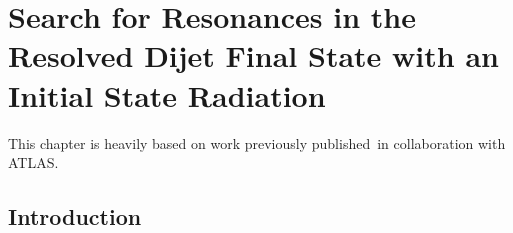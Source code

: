 \chapter{Search for Resonances in the Resolved Dijet Final State with an Initial State Radiation}
\label{chapter:dijetISR}

This chapter is heavily based on work previously published~\cite{dijetISR2019}in collaboration with ATLAS.

\section{Introduction}

\newcommand{\pt}{\ensuremath{p_{\text{T}}}\xspace}
\newcommand{\MGMCatNLOV}[1]{\textsc{MadGraph5}\_aMC@NLO~#1\xspace}
\newcommand{\PYTHIA}{\textsc{Pythia}\xspace}

\newcommand{\ifb}{\ensuremath(ifb)}
\newcommand{\ptmin}{\ensuremath{\pt^{\textrm{min}}}\xspace}
\newcommand{\nphoton}{\ensuremath{n_{\gamma}}\xspace}
\newcommand{\photonPt}{\ensuremath{E_{\textrm{T}}^{\gamma}}\xspace}
\newcommand{\jetPt}{\ensuremath{p_{\textrm{T}}^{\textrm{jet}}}\xspace}
\newcommand{\ntag}{\ensuremath{n_{\textrm{$b$-tag}}}\xspace}
\newcommand{\mjj}{\ensuremath{m_{\textrm{jj}}}\xspace}
\newcommand{\yStar}{\ensuremath{y^{\ast}}\xspace}
\newcommand{\jetEta}{\ensuremath{\eta^{\textrm{jet}}}\xspace}

\newcommand{\photonPtTrig}{\ensuremath{E_{\textrm{T, trig}}^{\gamma}}\xspace}
\newcommand{\photonEta}{\ensuremath{\eta^{\gamma}}\xspace}
\newcommand{\photonY}{\ensuremath{y^{\gamma}}\xspace}
\newcommand{\photonPhi}{\ensuremath{\phi^{\gamma}}\xspace}
\newcommand{\jetEt}{\ensuremath{E_{\textrm{T}}^{\textrm{jet}}}\xspace}

\newcommand{\jetY}[1]{\ensuremath{y_{#1}^{\textrm{jet}}}\xspace}
\newcommand{\jetPhi}{\ensuremath{\phi^{\textrm{jet}}}\xspace}
\newcommand{\njet}{\ensuremath{n_{\textrm{jets}}}\xspace}
\newcommand{\gq}{\ensuremath{g_{\textrm{q}}}\xspace}
\newcommand{\Zprime}{\ensuremath{Z^{\prime}}\xspace}
\newcommand{\lumiRange}{\ensuremath{76.6\textrm{--}79.8\,\ifb}\xspace}
\newcommand{\btagged}{\ensuremath{b}-\textrm{tagged}}
\newcommand{\btagging}{\ensuremath{b}-\textrm{tagging}}
\newcommand{\BumpHunter}{BumpHunter\xspace}

\newcommand{\MassRangeSingle}{\textcolor{red}{$169\,\GeV$\textrm{--}$300\,\GeV$}\xspace}
\newcommand{\MassRangeCompound}{\textcolor{red}{$300\,\GeV$\textrm{--}$X\,\GeV$}\xspace}
\newcommand{\ApproxMassRangeGamma}{\ensuremath{225~\GeV}\textrm{--}\ensuremath{1.1~\TeV}}
\newcommand{\FitStartGamma}{169~\GeV}
\newcommand{\FitStartJet}{303~\GeV}
\newcommand{\ChipvalGamma}{0.58\xspace}
\newcommand{\BHintervalGamma}{861~\GeV\textrm{--}917~\GeV}%
\newcommand{\BHpvalGamma}{0.67\xspace}%
\newcommand{\ChipvalJet}{0.90\xspace} 
\newcommand{\BHintervalJet}{482~\GeV\textrm{--}523~\GeV}
\newcommand{\BHpvalJet}{0.6\xspace}

